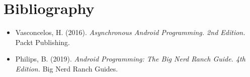 \documentclass{article}
\begin{document}
	\section*{Bibliography}
	\begin{itemize}
		\item Vasconcelos, H. (2016). \textit{Asynchronous Android Programming. 2nd Edition.} Packt Publishing.
		\item Philips, B. (2019). \textit{Android Programming: The Big Nerd Ranch Guide. 4th Edition.} Big Nerd Ranch Guides.
	\end{itemize}
	
\end{document}
